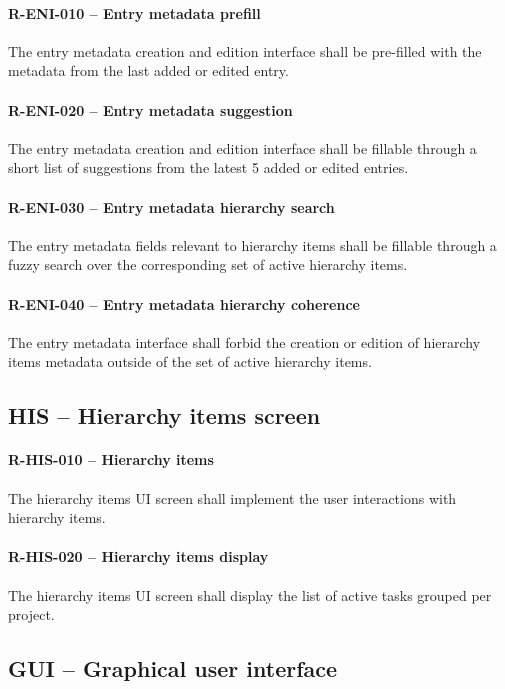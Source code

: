 \paragraph{R-ENI-010 -- Entry metadata prefill}
The entry metadata creation and edition interface shall be pre-filled with
the metadata from the last added or edited entry.

\paragraph{R-ENI-020 -- Entry metadata suggestion}
The entry metadata creation and edition interface shall be fillable through
a short list of suggestions from the latest 5 added or edited entries.

\paragraph{R-ENI-030 -- Entry metadata hierarchy search}
The entry metadata fields relevant to hierarchy items shall be fillable
through a fuzzy search over the corresponding set of active hierarchy items.

\paragraph{R-ENI-040 -- Entry metadata hierarchy coherence}
The entry metadata interface shall forbid the creation or edition of
hierarchy items metadata outside of the set of active hierarchy items.

\subsection{HIS -- Hierarchy items screen}
\paragraph{R-HIS-010 -- Hierarchy items}
The hierarchy items UI screen shall implement the user interactions with
hierarchy items.

\paragraph{R-HIS-020 -- Hierarchy items display}
The hierarchy items UI screen shall display the list of active tasks
grouped per project.

\subsection{GUI -- Graphical user interface}
